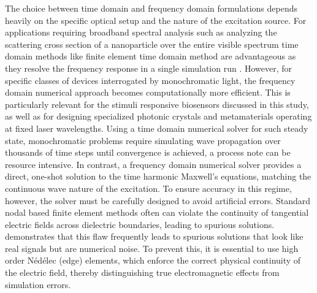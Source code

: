 \documentclass[class=report, crop=false]{standalone}
\begin{document}
The choice between time domain and frequency domain formulations depends heavily on the specific optical setup and the nature of the excitation source. For applications requiring broadband spectral analysis such as analyzing the scattering cross section of a nanoparticle over the entire visible spectrum time domain methods like finite element time domain method are advantageous as they resolve the frequency response in a single simulation run \citep{teixeira2023finite}. However, for specific classes of devices interrogated by monochromatic light, the frequency domain numerical approach becomes computationally more efficient. This is particularly relevant for the stimuli responsive biosensors discussed in this study, as well as for designing specialized photonic crystals and metamaterials operating at fixed laser wavelengths. Using a time domain numerical solver for such steady state, monochromatic problems require simulating wave propagation over thousands of time steps until convergence is achieved, a process \citet{Drezek2000} note can be resource intensive. In contrast, a frequency domain numerical solver provides a direct, one-shot solution to the time harmonic Maxwell's equations, matching the continuous wave nature of the excitation. To ensure accuracy in this regime, however, the solver must be carefully designed to avoid artificial errors. Standard nodal based finite element methods often can violate the continuity of tangential electric fields across dielectric boundaries, leading to spurious solutions. \citet{Schwarzbach2009} demonstrates that this flaw frequently leads to spurious solutions that look like real signals but are numerical noise. To prevent this, it is essential to use high order Nédélec (edge) elements, which enforce the correct physical continuity of the electric field, thereby distinguishing true electromagnetic effects \citep{Koba2012} from simulation errors.

\vspace{12pt}
\end{document}
